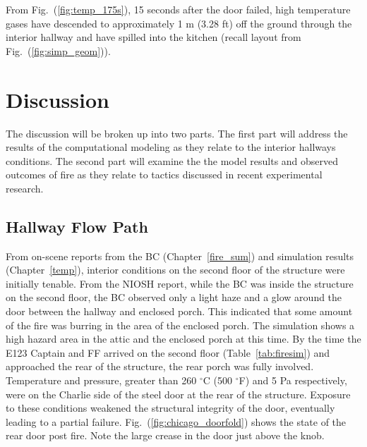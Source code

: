 \documentclass[11pt,oneside]{book}
\begin{document}
From Fig.~(\ref{fig:temp_175s}), 15 seconds after the door failed, high temperature gases have descended to approximately 1 m (3.28 ft) off the ground through the interior hallway and have spilled into the kitchen (recall layout from Fig.~(\ref{fig:simp_geom})).


\chapter{Discussion}
The discussion will be broken up into two parts. The first part will address the results of the computational modeling as they relate to the interior hallways conditions. The second part will examine the the model results and observed outcomes of fire as they relate to tactics discussed in recent experimental research. 

\section{Hallway Flow Path}
From on-scene reports from the BC (Chapter~\ref{fire_sum}) and simulation results (Chapter~\ref{temp}), interior conditions on the second floor of the structure were initially tenable. From the NIOSH report, while the BC was inside the structure on the second floor, the  BC observed only a light haze and a glow around the door between the hallway and enclosed porch. This indicated that some amount of the fire was burring in the area of the enclosed porch. The simulation shows a high hazard area in the attic and the enclosed porch at this time. By the time the E123 Captain and FF arrived on the second floor (Table~\ref{tab:firesim}) and approached the rear of the structure, the rear porch was fully involved. Temperature and pressure, greater than 260 $^{\circ}$C (500 $^{\circ}$F) and 5 Pa respectively, were on the Charlie side of the steel door at the rear of the structure. Exposure to these conditions weakened the structural integrity of the door, eventually leading to a partial failure. Fig.~(\ref{fig:chicago_doorfold}) shows the state of the rear door post fire. Note the large crease in the door just above the knob.
\end{document}
